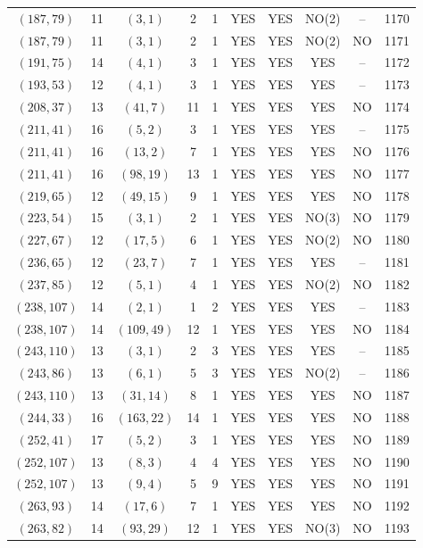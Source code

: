 \begin{longtable}{|c|c|c|c|c|c|c|c|c|c|}
$(187, 79)$ & 11 & $(3, 1)$ & 2 & 1 & YES & YES & NO(2) & -- & 1170\\
$(187, 79)$ & 11 & $(3, 1)$ & 2 & 1 & YES & YES & NO(2) & NO & 1171\\
$(191, 75)$ & 14 & $(4, 1)$ & 3 & 1 & YES & YES & YES & -- & 1172\\
$(193, 53)$ & 12 & $(4, 1)$ & 3 & 1 & YES & YES & YES & -- & 1173\\
$(208, 37)$ & 13 & $(41, 7)$ & 11 & 1 & YES & YES & YES & NO & 1174\\
$(211, 41)$ & 16 & $(5, 2)$ & 3 & 1 & YES & YES & YES & -- & 1175\\
$(211, 41)$ & 16 & $(13, 2)$ & 7 & 1 & YES & YES & YES & NO & 1176\\
$(211, 41)$ & 16 & $(98, 19)$ & 13 & 1 & YES & YES & YES & NO & 1177\\
$(219, 65)$ & 12 & $(49, 15)$ & 9 & 1 & YES & YES & YES & NO & 1178\\
$(223, 54)$ & 15 & $(3, 1)$ & 2 & 1 & YES & YES & NO(3) & NO & 1179\\
$(227, 67)$ & 12 & $(17, 5)$ & 6 & 1 & YES & YES & NO(2) & NO & 1180\\
$(236, 65)$ & 12 & $(23, 7)$ & 7 & 1 & YES & YES & YES & -- & 1181\\
$(237, 85)$ & 12 & $(5, 1)$ & 4 & 1 & YES & YES & NO(2) & NO & 1182\\
$(238, 107)$ & 14 & $(2, 1)$ & 1 & 2 & YES & YES & YES & -- & 1183\\
$(238, 107)$ & 14 & $(109, 49)$ & 12 & 1 & YES & YES & YES & NO & 1184\\
$(243, 110)$ & 13 & $(3, 1)$ & 2 & 3 & YES & YES & YES & -- & 1185\\
$(243, 86)$ & 13 & $(6, 1)$ & 5 & 3 & YES & YES & NO(2) & -- & 1186\\
$(243, 110)$ & 13 & $(31, 14)$ & 8 & 1 & YES & YES & YES & NO & 1187\\
$(244, 33)$ & 16 & $(163, 22)$ & 14 & 1 & YES & YES & YES & NO & 1188\\
$(252, 41)$ & 17 & $(5, 2)$ & 3 & 1 & YES & YES & YES & NO & 1189\\
$(252, 107)$ & 13 & $(8, 3)$ & 4 & 4 & YES & YES & YES & NO & 1190\\
$(252, 107)$ & 13 & $(9, 4)$ & 5 & 9 & YES & YES & YES & NO & 1191\\
$(263, 93)$ & 14 & $(17, 6)$ & 7 & 1 & YES & YES & YES & NO & 1192\\
$(263, 82)$ & 14 & $(93, 29)$ & 12 & 1 & YES & YES & NO(3) & NO & 1193\\

\end{longtable}
